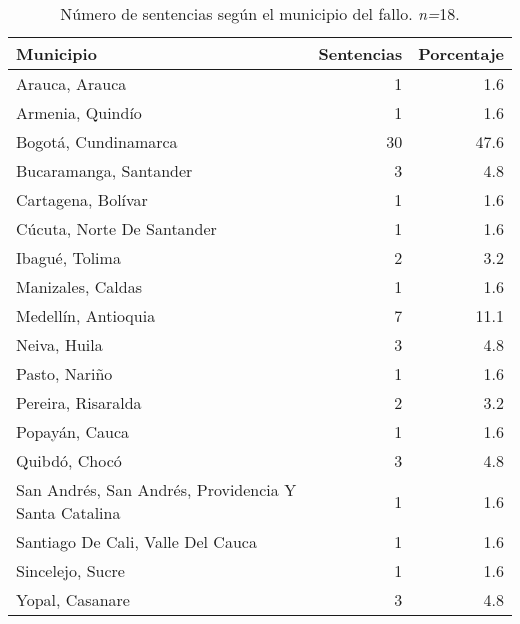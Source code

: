 \begin{table}[!htbp]
\centering
\caption{Número de sentencias según el municipio del fallo. \textit{n=}18.} 
\label{tab:munfal}
\begin{tabular}{lrr}
  \hline
Municipio & Sentencias & Porcentaje \\ 
  \hline
Arauca, Arauca &  1 & 1.6 \\ 
  Armenia, Quindío &  1 & 1.6 \\ 
  Bogotá, Cundinamarca & 30 & 47.6 \\ 
  Bucaramanga, Santander &  3 & 4.8 \\ 
  Cartagena, Bolívar &  1 & 1.6 \\ 
  Cúcuta, Norte De Santander &  1 & 1.6 \\ 
  Ibagué, Tolima &  2 & 3.2 \\ 
  Manizales, Caldas &  1 & 1.6 \\ 
  Medellín, Antioquia &  7 & 11.1 \\ 
  Neiva, Huila &  3 & 4.8 \\ 
  Pasto, Nariño &  1 & 1.6 \\ 
  Pereira, Risaralda &  2 & 3.2 \\ 
  Popayán, Cauca &  1 & 1.6 \\ 
  Quibdó, Chocó &  3 & 4.8 \\ 
  San Andrés, San Andrés, Providencia Y Santa Catalina &  1 & 1.6 \\ 
  Santiago De Cali, Valle Del Cauca &  1 & 1.6 \\ 
  Sincelejo, Sucre &  1 & 1.6 \\ 
  Yopal, Casanare &  3 & 4.8 \\ 
   \hline
\end{tabular}
\end{table}
